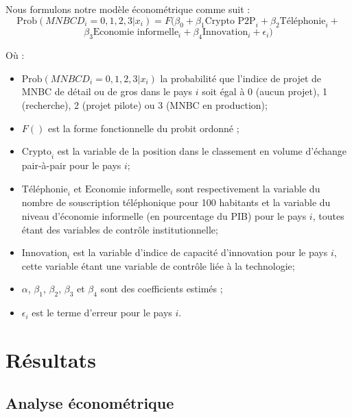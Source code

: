 \documentclass[12pt]{article}
\begin{document}
Nous formulons notre modèle économétrique comme suit :
\[
\text{Prob}(MNBCD_i = 0, 1, 2, 3|x_i) = F(\beta_0 + \beta_1 \text{Crypto P2P}_i + \beta_2 \text{Téléphonie}_i + \]
\[ \beta_3 \text{Economie informelle}_i + \beta_4 \text{Innovation}_i + \epsilon_i)\]

Où :
\begin{itemize}
  \item \( \text{Prob}(MNBCD_i = 0, 1, 2, 3|x_i) \) la probabilité que l'indice de projet de MNBC de détail ou de gros dans le pays \(i\) soit égal à 0 (aucun projet), 1 (recherche), 2 (projet pilote) ou 3 (MNBC en production);
  \item \(F()\) est la forme fonctionnelle du probit ordonné ;
  \item \( \text{Crypto}_i \) est la variable de la position dans le classement en volume d'échange pair-à-pair pour le pays  \(i\);
  \item \( \text{Téléphonie}_i \) et \( \text{Economie informelle}_i \) sont respectivement la variable du nombre de souscription téléphonique pour 100 habitants et la variable du niveau d'économie informelle (en pourcentage du PIB) pour le pays \(i\), toutes étant des variables de contrôle institutionnelle;
  \item \( \text{Innovation}_i \) est la variable d'indice de capacité d'innovation pour le pays \(i\), cette variable étant une variable de contrôle liée à la technologie;
  \item \(\alpha\), \(\beta_1\), \(\beta_2\), \(\beta_3\) et \(\beta_4\) sont des coefficients estimés ;
  \item \( \epsilon_i \) est le terme d'erreur pour le pays \(i\).
\end{itemize}

\section{Résultats}

\subsection{Analyse économétrique}
\end{document}
